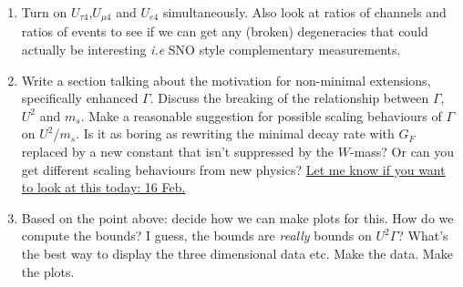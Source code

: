 \documentclass[11pt, a4paper]{article}
\newcommand{\newtext}[2]{\textcolor{#1}{\ul{#2}}}
\begin{document}
\begin{enumerate}
\item Turn on $U_{\tau 4}$,$U_{\mu 4}$ and $U_{e4}$ simultaneously. Also look
at ratios of channels and ratios of events to see if we can get any (broken)
degeneracies that could actually be interesting \emph{i.e} SNO style
complementary measurements.



\item Write a section talking about the motivation for non-minimal extensions,
specifically enhanced $\Gamma$. Discuss the breaking of the relationship
between $\Gamma$, $U^2$ and $m_s$.  Make a reasonable suggestion for possible
scaling behaviours of $\Gamma$ on $U^2$/$m_s$. Is it as boring as rewriting the
minimal decay rate with $G_F$ replaced by a new constant that isn't suppressed
by the $W$-mass? Or can you get different scaling behaviours from new physics? \newtext{PB}{Let me know if you want to look at this today: 16 Feb.}

\item Based on the point above: decide how we can make plots for this. How do
we compute the bounds? I guess, the bounds are \emph{really} bounds on
$U^2\Gamma$? What's the best way to display the three dimensional data etc.
Make the data. Make the plots.


\end{enumerate}
\end{document}
